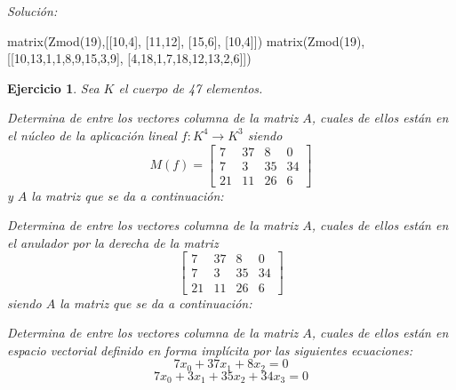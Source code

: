 \documentclass[12pt]{amsart}
\newtheorem{ejer}{Ejercicio}
\begin{document}
{\it Soluci\'on:}

\begin{sageblock}
matrix(Zmod(19),[[10,4],
[11,12],
[15,6],
[10,4]])
matrix(Zmod(19),[[10,13,1,1,8,9,15,3,9],
[4,18,1,7,18,12,13,2,6]])
\end{sageblock}



\begin{ejer} Sea $K$ el cuerpo de 47 elementos.
\newline
\noindent\begin{minipage}{\textwidth}
\begin{tcolorbox}[colback = green!20!white,title=Versión Núcleo]
Determina de entre los vectores columna de la matriz $A$, cuales de ellos están en el núcleo de la aplicación lineal $f:K^{4} \to K^{3}$ siendo  $$ M(f) = \left[\begin{array}{rrrr}
7 & 37 & 8 & 0 \\
7 & 3 & 35 & 34 \\
21 & 11 & 26 & 6
\end{array}\right] $$ y $A$ la matriz que se da a continuación:\end{tcolorbox}
\end{minipage} \newline
\noindent\begin{minipage}{\textwidth}
\begin{tcolorbox}[colback = blue!20!white,title=Versión Anulador]
Determina de entre los vectores columna de la matriz $A$, cuales de ellos están en el anulador por la derecha de la matriz $$ \left[\begin{array}{rrrr}
7 & 37 & 8 & 0 \\
7 & 3 & 35 & 34 \\
21 & 11 & 26 & 6
\end{array}\right] $$ siendo $A$ la matriz que se da a continuación:\end{tcolorbox}
\end{minipage} \newline
\noindent\begin{minipage}{\textwidth} 
\begin{tcolorbox}[colback = red!20!white,title=Versión Ecuaciones Implícitas]
Determina de entre los vectores columna de la matriz $A$, cuales de ellos están en espacio vectorial definido en forma implícita por las siguientes ecuaciones:
\[ 7 x_{0} + 37 x_{1} + 8 x_{2} = 0 \]
\[ 7 x_{0} + 3 x_{1} + 35 x_{2} + 34 x_{3} = 0 \]

\end{tcolorbox}
\end{minipage}
\end{ejer}
\end{document}
